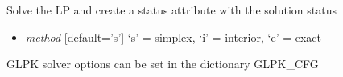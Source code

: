 \documentclass[a4paper,11pt,english]{sphinxmanual}
\begin{document}

\begin{fulllineitems}
\label{modules_doc:cbmpy.CBGLPK.glpk_Solve}
Solve the LP and create a status attribute with the solution status
\begin{itemize}
\item {} 
\emph{method} {[}default='s'{]} `s' = simplex, `i' = interior, `e' = exact

\end{itemize}

GLPK solver options can be set in the dictionary GLPK\_CFG

\end{fulllineitems}

\end{document}
